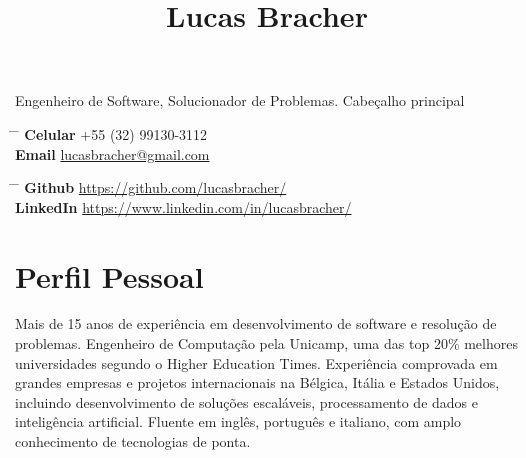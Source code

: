 \documentclass[10pt]{article} %
\begin{document}

\title{Lucas Bracher}{Engenheiro de Software, Solucionador de Problemas.} Cabeçalho principal


\parbox{0.5\textwidth}{ %
\begin{tabbing} %
\hspace{3cm} \= \hspace{4cm} \= \kill %
{\bf Celular} \> +55 (32) 99130-3112 \\ %
{\bf Email} \> \href{mailto:lucasbracher@gmail.com}{lucasbracher@gmail.com} \\ %
\end{tabbing}}
\hfill %
\parbox{0.5\textwidth}{ %
\begin{tabbing} %
\hspace{3cm} \= \hspace{4cm} \= \kill %
{\bf Github} \> \href{https://github.com/lucasbracher/}{https://github.com/lucasbracher/} \\ %
{\bf LinkedIn} \> \href{https://www.linkedin.com/in/lucasbracher/}{https://www.linkedin.com/in/lucasbracher/} \\ %
\end{tabbing}}


\section{Perfil Pessoal}

Mais de 15 anos de experiência em desenvolvimento de software e resolução de problemas. Engenheiro de Computação pela Unicamp, uma das top 20\% melhores universidades segundo o Higher Education Times. Experiência comprovada em grandes empresas e projetos internacionais na Bélgica, Itália e Estados Unidos, incluindo desenvolvimento de soluções escaláveis, processamento de dados e inteligência artificial. Fluente em inglês, português e italiano, com amplo conhecimento de tecnologias de ponta.
\end{document}
